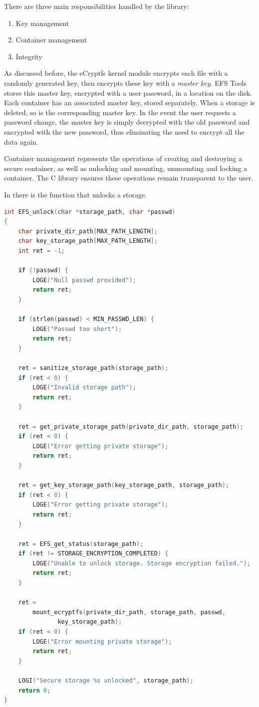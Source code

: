 There are three main responsibilities handled by the library:
\begin{enumerate}
\item Key management
\item Container management
\item Integrity
\end{enumerate}

As discussed before, the eCryptfs kernel module encrypts each file with a randomly generated key, then encrypts these key with a \textit{master key}. EFS Tools stores this master key, encrypted with a user password, in a location on the disk. Each container has an associated master key, stored separately. When a storage is deleted, so is the corresponding master key. In the event the user requests a password change, the master key is simply decrypted with the old password and encrypted with the new password, thus eliminating the need to encrypt all the data again.

Container management represents the operations of creating and destroying a secure container, as well as unlocking and mounting, unmounting and locking a container. The C library ensures these operations remain transparent to the user.

In  there is the function that unlocks a storage.

\begin{lstlisting}[language=C, caption=EFS unlock operation, label=lst:efs-unlock]
int EFS_unlock(char *storage_path, char *passwd)
{
    char private_dir_path[MAX_PATH_LENGTH];
    char key_storage_path[MAX_PATH_LENGTH];
    int ret = -1;

    if (!passwd) {
        LOGE("Null passwd provided");
        return ret;
    }

    if (strlen(passwd) < MIN_PASSWD_LEN) {
        LOGE("Passwd too short");
        return ret;
    }

    ret = sanitize_storage_path(storage_path);
    if (ret < 0) {
        LOGE("Invalid storage path");
        return ret;
    }

    ret = get_private_storage_path(private_dir_path, storage_path);
    if (ret < 0) {
        LOGE("Error getting private storage");
        return ret;
    }

    ret = get_key_storage_path(key_storage_path, storage_path);
    if (ret < 0) {
        LOGE("Error getting private storage");
        return ret;
    }

    ret = EFS_get_status(storage_path);
    if (ret != STORAGE_ENCRYPTION_COMPLETED) {
        LOGE("Unable to unlock storage. Storage encryption failed.");
        return ret;
    }

    ret =
        mount_ecryptfs(private_dir_path, storage_path, passwd,
               key_storage_path);
    if (ret < 0) {
        LOGE("Error mounting private storage");
        return ret;
    }

    LOGI("Secure storage %s unlocked", storage_path);
    return 0;
}
\end{lstlisting}

